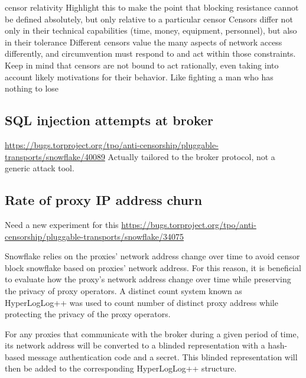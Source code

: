 \documentclass[letterpaper,twocolumn]{article}
\begin{document}

censor relativity
Highlight this to make the point that blocking resistance cannot be defined absolutely,
but only relative to a particular censor
Censors differ not only in their technical capabilities
(time, money, equipment, personnel),
but also in their tolerance
Different censors value the many aspects of network access differently,
and circumvention must respond to and act within those constraints.
Keep in mind that censors are not bound to act rationally,
even taking into account likely motivations for their behavior.
Like fighting a man who has nothing to lose

\subsection{SQL injection attempts at broker}



\url{https://bugs.torproject.org/tpo/anti-censorship/pluggable-transports/snowflake/40089}
Actually tailored to the broker protocol, not a generic attack tool.

\subsection{Rate of proxy IP address churn}
\label{sec:proxy-churn}


Need a new experiment for this
\url{https://bugs.torproject.org/tpo/anti-censorship/pluggable-transports/snowflake/34075}


Snowflake relies on the proxies' network address change over time to avoid censor block snowflake based on proxies' network address. For this reason, it is beneficial to evaluate how the proxy's network address change over time while preserving the privacy of proxy operators. A distinct count system known as HyperLogLog++ was used to count number of distinct proxy address while protecting the privacy of the proxy operators.

For any proxies that communicate with the broker during a given period of time, its network address will be converted to a blinded representation with a hash-based message authentication code and a secret. This blinded representation will then be added to the corresponding HyperLogLog++ structure.
\end{document}
